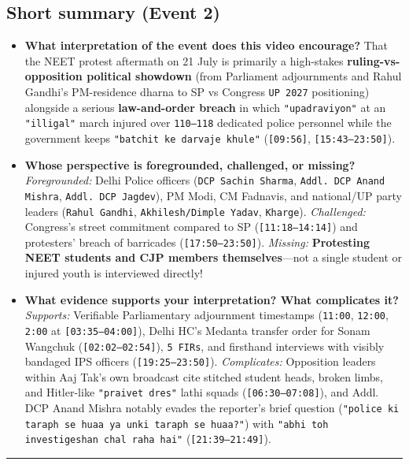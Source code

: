 \documentclass[10pt,a4paper]{article}
\begin{document}
\subsection*{Short summary (Event 2)}
\begin{itemize}[leftmargin=1.5em, itemsep=3pt, topsep=4pt]
  \item \textbf{What interpretation of the event does this video encourage?} That the NEET protest aftermath on 21 July is primarily a high-stakes \textbf{ruling-vs-opposition political showdown} (from Parliament adjournments and Rahul Gandhi's PM-residence dharna to SP vs Congress \texttt{UP 2027} positioning) alongside a serious \textbf{law-and-order breach} in which \texttt{"upadraviyon"} at an \texttt{"illigal"} march injured over \texttt{110--118} dedicated police personnel while the government keeps \texttt{"batchit ke darvaje khule"} (\texttt{[09:56]}, \texttt{[15:43--23:50]}).
  \item \textbf{Whose perspective is foregrounded, challenged, or missing?} \textit{Foregrounded:} Delhi Police officers (\texttt{DCP Sachin Sharma}, \texttt{Addl. DCP Anand Mishra}, \texttt{Addl. DCP Jagdev}), PM Modi, CM Fadnavis, and national/UP party leaders (\texttt{Rahul Gandhi}, \texttt{Akhilesh/Dimple Yadav}, \texttt{Kharge}). \textit{Challenged:} Congress's street commitment compared to SP (\texttt{[11:18--14:14]}) and protesters' breach of barricades (\texttt{[17:50--23:50]}). \textit{Missing:} \textbf{Protesting NEET students and CJP members themselves}---not a single student or injured youth is interviewed directly!
  \item \textbf{What evidence supports your interpretation? What complicates it?} \textit{Supports:} Verifiable Parliamentary adjournment timestamps (\texttt{11:00}, \texttt{12:00}, \texttt{2:00} at \texttt{[03:35--04:00]}), Delhi HC's Medanta transfer order for Sonam Wangchuk (\texttt{[02:02--02:54]}), \texttt{5 FIRs}, and firsthand interviews with visibly bandaged IPS officers (\texttt{[19:25--23:50]}). \textit{Complicates:} Opposition leaders within Aaj Tak's own broadcast cite stitched student heads, broken limbs, and Hitler-like \texttt{"praivet dres"} lathi squads (\texttt{[06:30--07:08]}), and Addl. DCP Anand Mishra notably evades the reporter's brief question (\texttt{"police ki taraph se huaa ya unki taraph se huaa?"}) with \texttt{"abhi toh investigeshan chal raha hai"} (\texttt{[21:39--21:49]}).
\end{itemize}
\vspace{4pt}\noindent\rule{\textwidth}{0.4pt}\vspace{4pt}
\end{document}

